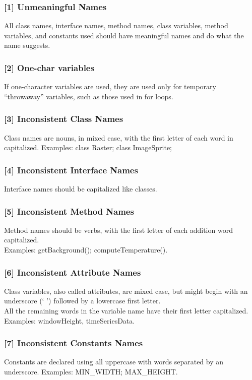 \subsubsection{[1] Unmeaningful Names}
All class names, interface names, method names, class variables, method variables, and constants used should have meaningful names and do what the name suggests.
\subsubsection{[2] One-char variables}
If one-character variables are used, they are used only for temporary “throwaway” variables, such as those used in for loops.
\subsubsection{[3] Inconsistent Class Names}
Class names are nouns, in mixed case, with the first letter of each word in capitalized. Examples: class Raster; class ImageSprite;
\subsubsection{[4] Inconsistent Interface Names}
Interface names should be capitalized like classes.
\subsubsection{[5] Inconsistent Method Names}
Method names should be verbs, with the first letter of each addition word capitalized.\\
Examples: getBackground(); computeTemperature().
\subsubsection{[6] Inconsistent Attribute Names}
Class variables, also called attributes, are mixed case, but might begin with an underscore (‘ ’) followed by a lowercase first letter.\\
All the remaining words in the variable name have their first letter capitalized. Examples:   windowHeight, timeSeriesData.
\subsubsection{[7] Inconsistent Constants Names}
Constants are declared using all uppercase with words separated by an underscore. Examples: MIN\_WIDTH; MAX\_HEIGHT.